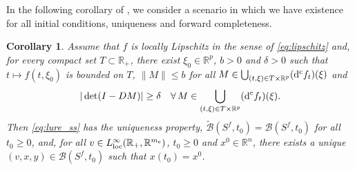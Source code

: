 \documentclass[a4paper,11pt]{article}
\newcommand{\R}{\mathbb R}
\newcommand{\sB}{{\mathcal B}}
\numberwithin{equation}{section}
\numberwithin{figure}{section}
\numberwithin{table}{section}
\newtheorem{corollary}[theorem]{Corollary}
\begin{document}
In the following corollary of , we consider a scenario
in which we have existence for all initial conditions, uniqueness and forward completeness.
%
\begin{corollary}\label{cor:single_valued_uniqueness'}
Assume that $f$ is locally Lipschitz in the sense of \eqref{eq:lipschitz} and, for every
compact set $T\subset\R_+$, there exist $\xi_0\in\R^p$, $b>0$ and $\delta>0$ such that $t\mapsto f(t,\xi_0)$ is bounded on $T$, $\|M\|\leq b$ for all $M\in\bigcup_{(t,\xi)\in T\times
\R^p}({\rm d}^{\rm c}f_t)(\xi)$ and
\begin{equation}\label{eq:det_condition}
|\det(I-DM)|\geq\delta\quad\forall\,M\in\bigcup_{(t,\xi)\in T\times
\R^p}({\rm d}^{\rm c}f_t)(\xi).
\end{equation}
Then \eqref{eq:lure_ss} has the uniqueness property, $\tilde\sB(S^f,t_0)=\sB(S^f,t_0)$ for all $t_0\geq 0$, and, for all $v\in L^\infty_{\rm loc}(\R_+,\R^{m_{\rm e}})$, $t_0\geq 0$ and $x^0\in\R^n$, there exists a unique $(v,x,y)\in \sB(S^f,t_0)$ such that $x(t_0)=x^0$.
\end{corollary}
%
\end{document}
